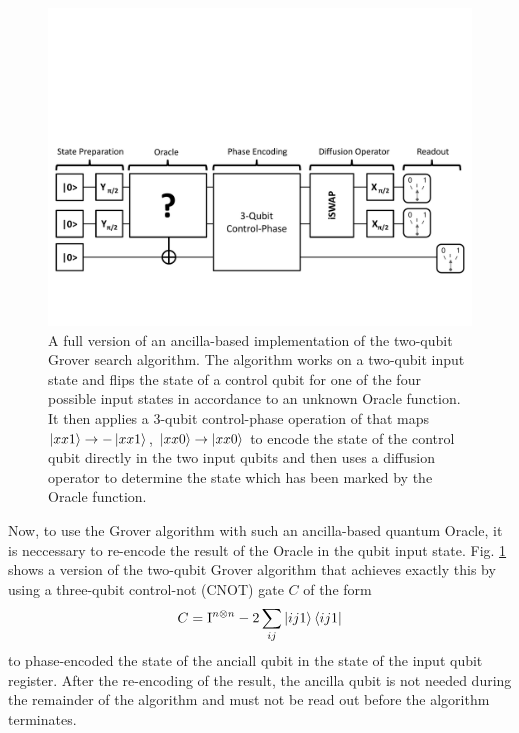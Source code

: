 \begin{figure}[ht!]
	\centering
		\includegraphics[width=1\textwidth]{./material/papers/grover/quantum_algorithm_full}
	\caption[Full version of an ancilla-based implementation of the two-qubit Grover search algorithm]{A full version of an ancilla-based implementation of the two-qubit Grover search algorithm. The algorithm works on a two-qubit input state and flips the state of a control qubit for one of the four possible input states in accordance to an unknown Oracle function. It then applies a 3-qubit control-phase operation of that maps $\left| xx1 \right>\to -\left| xx1 \right>$, $\left| xx0 \right>\to\left| xx0 \right>$ to encode the state of the control qubit directly in the two input qubits and then uses a diffusion operator to determine the state which has been marked by the Oracle function.}
	\label{fig:GroverAlgorithmFullSchematic}
\end{figure}

\smallskip

Now, to use the Grover algorithm with such an ancilla-based quantum Oracle, it is neccessary to re-encode the result of the Oracle in the qubit input state. Fig. \ref{fig:GroverAlgorithmFullSchematic} shows a version of the two-qubit Grover algorithm that achieves exactly this by using a three-qubit control-not (CNOT) gate $C$ of the form
%
\begin{equation}
C = \mathrm{I}^{n\otimes n}-2\sum\limits_{ij} \left| ij1 \right>\left< ij1 \right|
\end{equation}
%
to phase-encoded the state of the anciall qubit in the state of the input qubit register. After the re-encoding of the result, the ancilla qubit is not needed during the remainder of the algorithm and must not be read out before the algorithm terminates.

